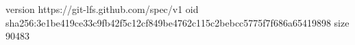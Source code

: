 version https://git-lfs.github.com/spec/v1
oid sha256:3e1be419ce33c9fb42f5c12cf849be4762c115c2bebcc5775f7f686a65419898
size 90483
